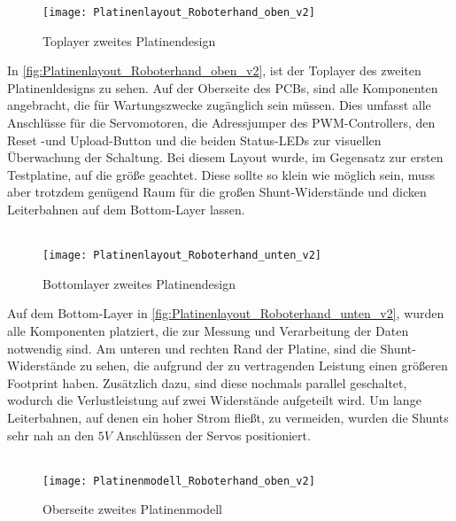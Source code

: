 \documentclass[titlepage,12pt,twoside]{article}
\begin{document}
\begin{figure}[H]
	\begin{center}
		\scalebox{0.8}
		{\texttt{[image: Platinenlayout\_Roboterhand\_oben\_v2]}}
		\caption{Toplayer zweites Platinendesign}
		\label{fig:Platinenlayout_Roboterhand_oben_v2}	
	\end{center}
\end{figure}
\hfill \break
In \autoref{fig:Platinenlayout_Roboterhand_oben_v2}, ist der Toplayer des zweiten Platinenldesigns zu sehen. Auf der Oberseite des
PCBs, sind alle Komponenten angebracht, die für Wartungszwecke zugänglich sein müssen. Dies umfasst alle Anschlüsse für die Servomotoren,
die Adressjumper des PWM-Controllers, den Reset -und Upload-Button und die beiden Status-LEDs zur visuellen Überwachung der Schaltung. 
Bei diesem Layout wurde, im Gegensatz zur ersten Testplatine, auf die größe geachtet. Diese sollte so klein wie möglich sein, muss
aber trotzdem genügend Raum für die großen Shunt-Widerstände und dicken Leiterbahnen auf dem Bottom-Layer lassen. \\
\\
\begin{figure}[H]
	\begin{center}
		\scalebox{0.8}
		{\texttt{[image: Platinenlayout\_Roboterhand\_unten\_v2]}}
		\caption{Bottomlayer zweites Platinendesign}
		\label{fig:Platinenlayout_Roboterhand_unten_v2}		
	\end{center}
\end{figure}
\hfill \break
Auf dem Bottom-Layer in \autoref{fig:Platinenlayout_Roboterhand_unten_v2}, wurden alle Komponenten platziert, die zur Messung und Verarbeitung
der Daten notwendig sind. Am unteren und rechten Rand der Platine, sind die Shunt-Widerstände zu sehen, die aufgrund der zu vertragenden
Leistung einen größeren Footprint haben. Zusätzlich dazu, sind diese nochmals parallel geschaltet, wodurch die Verlustleistung auf 
zwei Widerstände aufgeteilt wird. Um lange Leiterbahnen, auf denen ein hoher Strom fließt, zu vermeiden, wurden die Shunts sehr nah 
an den $5V$ Anschlüssen der Servos positioniert. \\
\\
\begin{figure}[H]
	\begin{center}
		\scalebox{0.8}
		{\texttt{[image: Platinenmodell\_Roboterhand\_oben\_v2]}}
		\caption{Oberseite zweites Platinenmodell}
		\label{fig:Platinenmodell_Roboterhand_oben_v2}		
	\end{center}
\end{figure}
\end{document}
